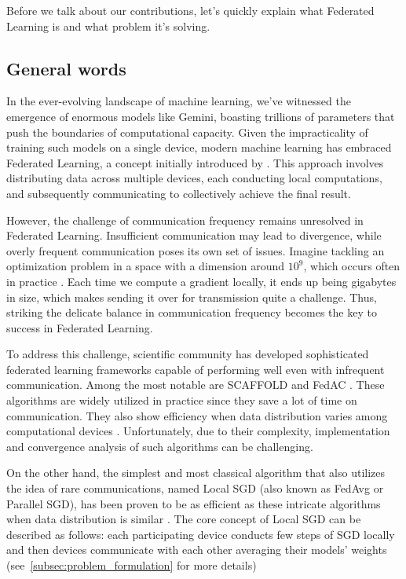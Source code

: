 
Before we talk about our contributions, let's quickly explain what Federated Learning is and what problem it's solving.

\subsection{General words}

In the ever-evolving landscape of machine learning, we've witnessed the emergence of enormous models like Gemini, boasting trillions of parameters that push the boundaries of computational capacity. Given the impracticality of training such models on a single device, modern machine learning has embraced Federated Learning, a concept initially introduced by \cite{McMahan}. This approach involves distributing data across multiple devices, each conducting local computations, and subsequently communicating to collectively achieve the final result.

\vspace{10pt}

However, the challenge of communication frequency remains unresolved in Federated Learning. Insufficient communication may lead to divergence, while overly frequent communication poses its own set of issues. Imagine tackling an optimization problem in a space with a dimension around $10^9$, which occurs often in practice \citep{shahid2021communication}. Each time we compute a gradient locally, it ends up being gigabytes in size, which makes sending it over for transmission quite a challenge. Thus, striking the delicate balance in communication frequency becomes the key to success in Federated Learning.

\vspace{10pt}

To address this challenge, scientific community has developed sophisticated federated learning frameworks capable of performing well even with infrequent communication. Among the most notable are SCAFFOLD \citep{Scaffold} and FedAC \citep{FedAC}. These algorithms are widely utilized in practice since they save a lot of time on communication. They also show efficiency when data distribution varies among computational devices \citep{Hospitals}. Unfortunately, due to their complexity, implementation and convergence analysis of such algorithms can be challenging.

\vspace{10pt}

On the other hand, the simplest and most classical algorithm that also utilizes the idea of rare communications, named Local SGD (also known as FedAvg or Parallel SGD), has been proven to be as efficient as these intricate algorithms when data distribution is similar \citep{KEK LOL}. 
The core concept of Local SGD can be described as follows: each participating device conducts few steps of SGD locally and then devices communicate with each other averaging their models' weights (see~\ref{subsec:problem_formulation} for more details)

